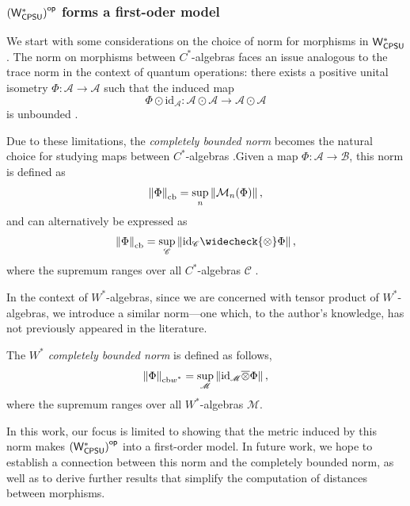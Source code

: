\vspace{10pt}

\subsubsection{$\left(\mathsf{W^*_{CPSU}}\right)^{\mathsf{op}}$ forms a first-oder model}



We start with some considerations on the choice of norm for morphisms in $\mathsf{W^*_{CPSU}}$. The norm on morphisms between $C^*$-algebras
faces  an issue analogous to the trace norm in the context of quantum operations:  there exists a positive unital isometry \( \Phi \colon \mathscr{A} \to \mathscr{A} \) such that the induced map
\[
\Phi \odot \mathrm{id}_\mathscr{A} \colon \mathscr{A} \odot \mathscr{A} \to \mathscr{A} \odot \mathscr{A}
\]
is unbounded \cite[Prop. 3.5.2]{brownCalgebrasFinitedimensionalApproximations}.

Due to these limitations, the \emph{completely bounded norm} becomes the natural choice for studying maps between $C^*$-algebras \cite{effrosOperatorSpaces2000,paulsenCompletelyBoundedMaps2003}.Given a map \( \Phi \colon \mathscr{A} \to \mathscr{B} \), this norm is defined as
\[
\left\lVert \Phi \right\rVert_{\text{cb}} = \sup_n \left\| \mathcal{M}_{n}(\Phi) \right\|,
\]
and can alternatively be expressed as
\[
\cbnorm{\Phi} = \sup_{\mathscr{C}} \left\| \id_{\mathscr{C}} \widecheck{\otimes} \Phi \right\|,
\]
where the supremum ranges over all $C^*$-algebras \( \mathscr{C} \) \cite[Introduction, p.~4]{pisierTensorProductsCAlgebras2020}.

In the context of $W^*$-algebras, since we are concerned with tensor product of $W^*$-algebras, we introduce a similar norm---one which, to the author's knowledge, has not previously appeared in the literature.
\begin{definition} \label{def:wcb_nor}
The \emph{$W^*$ completely bounded norm} is defined as follows,
  \[ \left\lVert \Phi \right\rVert_{\text{cb$w^*$}} = \sup_{\mathscr{M}} \left\lVert \mathrm{id}_{\mathscr{M}} \overline{\otimes} \Phi \right\rVert, \]
where the supremum ranges over all $W^*$-algebras \( \mathscr{M} \).
\end{definition}

In this work, our focus is limited to showing that the metric induced by this norm makes $\left(\mathsf{W^*_{CPSU}}\right)^{\mathsf{op}}$ into a first-order model. In future work, we hope to establish a connection between this norm and the completely bounded norm, as well as to derive further results that simplify the computation of distances between morphisms.

